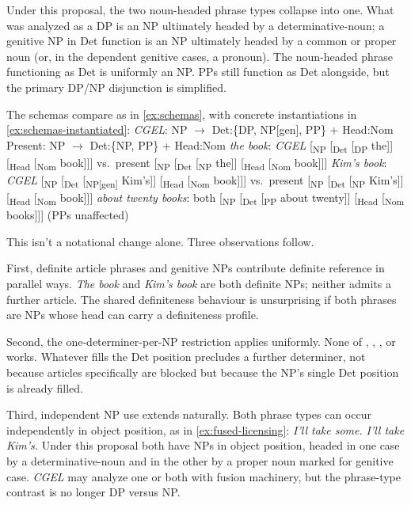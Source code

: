 \documentclass[12pt]{article}
\begin{document}
Under this proposal, the two noun-headed phrase types collapse into one. What was analyzed as a DP is an NP ultimately headed by a determinative-noun; a genitive NP in Det function is an NP ultimately headed by a common or proper noun (or, in the dependent genitive cases, a pronoun). The noun-headed phrase functioning as Det is uniformly an NP. PPs still function as Det alongside, but the primary DP/NP disjunction is simplified.

The schemas compare as in \ref{ex:schemas}, with concrete instantiations in \ref{ex:schemas-instantiated}:
\ea\label{ex:schemas}
\ea \textit{CGEL}: NP $\rightarrow$ Det:\{DP, NP[gen], PP\} + Head:Nom
\ex Present: NP $\rightarrow$ Det:\{NP, PP\} + Head:Nom
\z
\z
\ea\label{ex:schemas-instantiated}
\ea \textit{the book}: \textit{CGEL} [\textsubscript{NP} [\textsubscript{Det} [\textsubscript{DP} the]] [\textsubscript{Head} [\textsubscript{Nom} book]]] vs.\ present [\textsubscript{NP} [\textsubscript{Det} [\textsubscript{NP} the]] [\textsubscript{Head} [\textsubscript{Nom} book]]]
\ex \textit{Kim's book}: \textit{CGEL} [\textsubscript{NP} [\textsubscript{Det} [\textsubscript{NP[gen]} Kim's]] [\textsubscript{Head} [\textsubscript{Nom} book]]] vs.\ present [\textsubscript{NP} [\textsubscript{Det} [\textsubscript{NP} Kim's]] [\textsubscript{Head} [\textsubscript{Nom} book]]]
\ex \textit{about twenty books}: both [\textsubscript{NP} [\textsubscript{Det} [\textsubscript{PP} about twenty]] [\textsubscript{Head} [\textsubscript{Nom} books]]] (PPs unaffected)
\z
\z

This isn't a notational change alone. Three observations follow.

First, definite article phrases and genitive NPs contribute definite reference in parallel ways. \textit{The book} and \textit{Kim's book} are both definite NPs; neither admits a further article. The shared definiteness behaviour is unsurprising if both phrases are NPs whose head can carry a definiteness profile.

Second, the one-determiner-per-NP restriction applies uniformly. None of , , , or  works. Whatever fills the Det position precludes a further determiner, not because articles specifically are blocked but because the NP's single Det position is already filled.

Third, independent NP use extends naturally. Both phrase types can occur independently in object position, as in \ref{ex:fused-licensing}:
\ea\label{ex:fused-licensing}
\ea \textit{I'll take some.}
\ex \textit{I'll take Kim's.}
\z
\z
Under this proposal both have NPs in object position, headed in one case by a determinative-noun and in the other by a proper noun marked for genitive case. \textit{CGEL} may analyze one or both with fusion machinery, but the phrase-type contrast is no longer DP versus NP.
\end{document}

